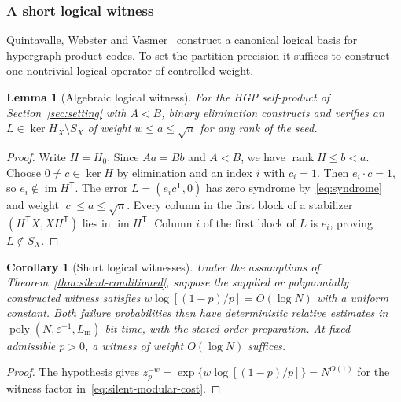\documentclass[10pt,twocolumn]{article}
\newtheorem{corollary}[theorem]{Corollary}
\newtheorem{lemma}[theorem]{Lemma}
\theoremstyle{definition}
\DeclareMathOperator{\im}{im}
\DeclareMathOperator{\poly}{poly}
\newcommand{\Lin}{L_{\mathrm{in}}}
\begin{document}
\subsubsection{A short logical witness}
Quintavalle, Webster and Vasmer~\cite[Section~2.1]{QWV23} construct a
canonical logical basis for hypergraph-product codes. To set the
partition precision it suffices to construct one nontrivial logical
operator of controlled weight.
\begin{lemma}[Algebraic logical witness]\label{lem:total-witness}
For the HGP self-product of Section~\ref{sec:setting} with $A<B$,
binary elimination constructs and verifies an $L\in\ker H_X\setminus S_X$
of weight $w\le a\le\sqrt n$ for any rank of the seed.
\end{lemma}
\begin{proof}
Write $H=H_0$. Since $Aa=Bb$ and $A<B$, we have
$\operatorname{rank}H\le b<a$. Choose $0\ne c\in\ker H$ by elimination
and an index $i$ with $c_i=1$. Then $e_i\cdot c=1$, so
$e_i\notin\im H^{\mathsf T}$. The error $L=(e_i c^{\mathsf T},0)$ has
zero syndrome by~\eqref{eq:syndrome} and weight $|c|\le a\le\sqrt n$.
Every column in the first block of a stabilizer
$(H^{\mathsf T}X,XH^{\mathsf T})$ lies in $\im H^{\mathsf T}$.
Column $i$ of the first block of $L$ is $e_i$, proving $L\notin S_X$.
\end{proof}

\begin{corollary}[Short logical witnesses]\label{cor:short-witness}
Under the assumptions of Theorem~\ref{thm:silent-conditioned}, suppose
the supplied or polynomially constructed witness satisfies
\(w\log[(1-p)/p]=O(\log N)\) with a uniform constant. Both failure
probabilities then have deterministic relative estimates in
\(\poly(N,\varepsilon^{-1},\Lin)\) bit time, with the stated order preparation.
At fixed admissible \(p>0\), a witness of weight \(O(\log N)\) suffices.
\end{corollary}
\begin{proof}
The hypothesis gives \(z_p^{-w}=\exp\{w\log[(1-p)/p]\}=N^{O(1)}\)
for the witness factor in~\eqref{eq:silent-modular-cost}.
\end{proof}
\end{document}
